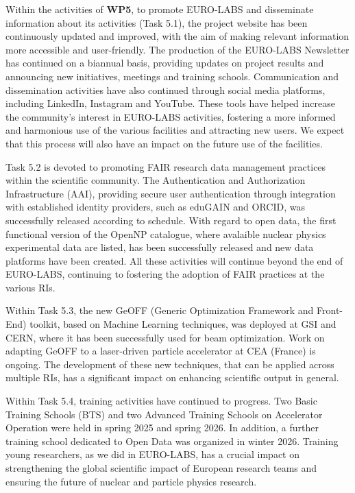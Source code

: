 Within the activities of 
\textbf{WP5}, 
to promote EURO-LABS and disseminate information about its activities (Task 5.1), the project website has been continuously updated and improved, with the aim of making relevant information more accessible and user-friendly. The production of the EURO-LABS Newsletter has continued on a biannual basis, providing updates on project results and announcing new initiatives, meetings and training schools. Communication and dissemination activities have also continued through social media platforms, including LinkedIn, Instagram and YouTube.
These tools have helped increase the community's interest in EURO-LABS activities, fostering a more informed and harmonious use of the various facilities and attracting new users.
We expect that this process will also have an impact on the future use of the facilities.

Task 5.2 is devoted to promoting FAIR research data management practices within the scientific
community.
The Authentication and Authorization Infrastructure (AAI), providing secure user authentication through integration with established identity providers, such as eduGAIN and ORCID, was successfully released according to schedule. With regard to open data, the first functional version of the OpenNP catalogue, where avalaible nuclear physics experimental data are listed,  has been successfully released and new data platforms have been created. All these activities will continue beyond the end of EURO-LABS, continuing to fostering the adoption of FAIR practices at the various RIs. 

Within Task 5.3, 
the new GeOFF (Generic Optimization Framework and Front-End) toolkit, based on Machine Learning techniques, was deployed at GSI and CERN, where it has been successfully used for beam optimization. Work on adapting GeOFF to a laser-driven particle accelerator at CEA (France) is ongoing. 
The development of these new techniques, that can be applied across multiple RIs, has a significant impact on 
enhancing scientific output in general.

Within Task 5.4, training activities have continued to progress. Two Basic Training Schools (BTS) and two Advanced Training Schools on Accelerator Operation were held in spring 2025 and spring 2026. In addition, a further training school dedicated to Open Data was organized in winter 2026. 
Training young researchers, as we did in EURO-LABS, has a crucial impact on strengthening the global scientific
impact of European research teams and ensuring the future of nuclear and particle physics research.

